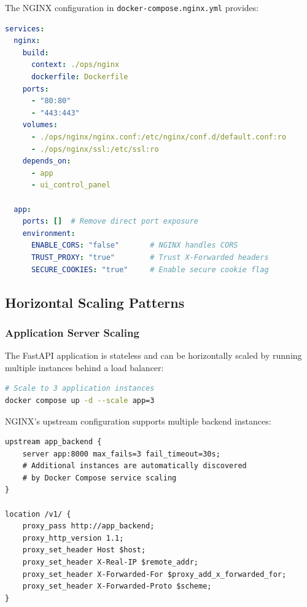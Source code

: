 The NGINX configuration in \texttt{docker-compose.nginx.yml} provides:

\begin{lstlisting}[language=yaml, caption=NGINX production configuration]
services:
  nginx:
    build:
      context: ./ops/nginx
      dockerfile: Dockerfile
    ports:
      - "80:80"
      - "443:443"
    volumes:
      - ./ops/nginx/nginx.conf:/etc/nginx/conf.d/default.conf:ro
      - ./ops/nginx/ssl:/etc/ssl:ro
    depends_on:
      - app
      - ui_control_panel

  app:
    ports: []  # Remove direct port exposure
    environment:
      ENABLE_CORS: "false"       # NGINX handles CORS
      TRUST_PROXY: "true"        # Trust X-Forwarded headers
      SECURE_COOKIES: "true"     # Enable secure cookie flag
\end{lstlisting}

\subsection{Horizontal Scaling Patterns}

\subsubsection{Application Server Scaling}

The FastAPI application is stateless and can be horizontally scaled by running multiple instances behind a load balancer:

\begin{lstlisting}[language=bash, caption=Scaling application instances]
# Scale to 3 application instances
docker compose up -d --scale app=3
\end{lstlisting}

NGINX's upstream configuration supports multiple backend instances:

\begin{lstlisting}[language=nginx, caption=NGINX upstream configuration for load balancing]
upstream app_backend {
    server app:8000 max_fails=3 fail_timeout=30s;
    # Additional instances are automatically discovered
    # by Docker Compose service scaling
}

location /v1/ {
    proxy_pass http://app_backend;
    proxy_http_version 1.1;
    proxy_set_header Host $host;
    proxy_set_header X-Real-IP $remote_addr;
    proxy_set_header X-Forwarded-For $proxy_add_x_forwarded_for;
    proxy_set_header X-Forwarded-Proto $scheme;
}
\end{lstlisting}

